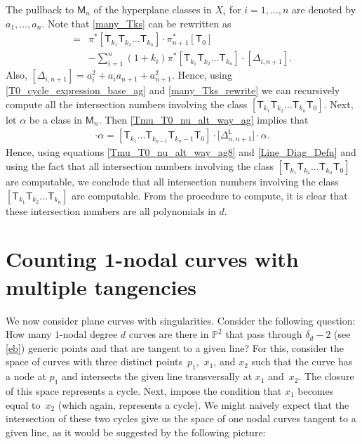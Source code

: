\documentclass[pdftex]{sigma}
\numberwithin{equation}{section}
\begin{document}
\begin{rem} The pullback to $\mathsf{M}_n$ of the hyperplane classes in
$X_{i}$ for $i = 1, \dots, n$ are denoted by $a_1, \dots, a_n$. Note that \eqref{many_Tks} can be rewritten as
\begin{align}
[\mathsf{T}_{k_1} \mathsf{T}_{k_2} \dots \mathsf{T}_{k_n} \mathsf{T}_{0}]  ={}&
\pi^{\ast}[\mathsf{T}_{k_1} \mathsf{T}_{k_2} \dots \mathsf{T}_{k_n}]\cdot
\pi_{n+1}^{\ast}[\mathsf{T}_0] \nonumber\\
&-\sum_{i=1}^{n}(1+k_i) \pi^{\ast} [\mathsf{T}_{k_1} \mathsf{T}_{k_2} \dots \mathsf{T}_{k_n}] \cdot
[\Delta_{i, {n+1}}].\label{many_Tks_rewrite}
\end{align}
Also, $[\Delta_{i, {n+1}}] = a_i^2 + a_i a_{n+1} + a_{n+1}^2$.
Hence,
using \eqref{T0_cycle_expression_base_ag} and \eqref{many_Tks_rewrite}
we can recursively compute all the intersection numbers
involving
the class $[\mathsf{T}_{k_1} \mathsf{T}_{k_2} \dots \mathsf{T}_{k_n} \mathsf{T}_{0}]$.
Next, let $\alpha$ be a class in $\mathsf{M}_n$.
Then \eqref{Tmu_T0_nu_alt_way_ag} implies that
\begin{align}
[\mathsf{T}_{k_1} \dots \mathsf{T}_{k_n}] \cdot \alpha =  [\mathsf{T}_{k_1} \dots \mathsf{T}_{k_{n-1}} \mathsf{T}_{k_n-1}
\mathsf{T}_0] \cdot \bigl[\Delta_{n, {n+1}}^{\mathsf{L}}\bigr] \cdot \alpha. \label{Tmu_T0_nu_alt_way_ag8}
\end{align}
Hence, using equations
\eqref{Tmu_T0_nu_alt_way_ag8} and \eqref{Line_Diag_Defn}
and using the fact that all
intersection numbers
involving
the class $[\mathsf{T}_{k_1} \mathsf{T}_{k_2} \dots \mathsf{T}_{k_n} \mathsf{T}_{0}]$
are computable, we conclude that
all
intersection numbers
involving
the class $[\mathsf{T}_{k_1} \mathsf{T}_{k_2} \dots \mathsf{T}_{k_n}]$
are computable. From the procedure to compute, it is clear that these
intersection numbers are all polynomials in $d$.
\end{rem}

\section[Counting 1-nodal curves with multiple tangencies]{Counting $\boldsymbol{ 1}$-nodal curves with multiple tangencies}\label{nodal_tang}
\label{one_nodal_tang_comp}

We now consider plane curves with singularities.
Consider the following question: How many $1$-nodal degree $d$
curves are there in $\mathbb{P}^2$
that pass through $\delta_d-2$ (see \eqref{eb})
generic points and that are tangent to a given line?
For this, consider
the space of curves with three distinct points~$p_1$,~$x_1$, and $x_2$ such that the curve has a node at $p_1$ and intersects the given line
transversally at $x_1$ and~$x_2$.
The closure of this space represents a cycle.
Next, impose the condition
that $x_1$ becomes equal to~$x_2$ (which again, represents a cycle). We might naively expect that
the intersection of these two cycles give us the space of one nodal curves
tangent to a given line, as it would be suggested by the following picture:
\end{document}
